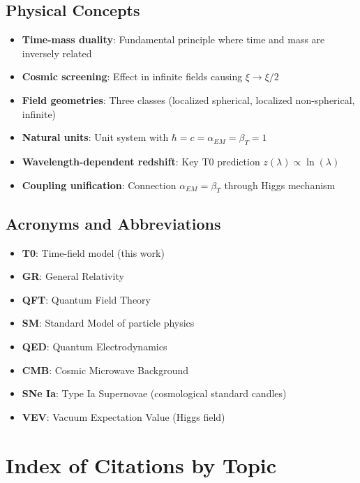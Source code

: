 \documentclass[12pt,a4paper]{article}
\begin{document}
	\subsection{Physical Concepts}
	\label{app:physics_concepts}
	
	\begin{itemize}
		\item \textbf{Time-mass duality}: Fundamental principle where time and mass are inversely related
		\item \textbf{Cosmic screening}: Effect in infinite fields causing $\xi \to \xi/2$
		\item \textbf{Field geometries}: Three classes (localized spherical, localized non-spherical, infinite)
		\item \textbf{Natural units}: Unit system with $\hbar = c = \alpha_{EM} = \beta_T = 1$
		\item \textbf{Wavelength-dependent redshift}: Key T0 prediction $z(\lambda) \propto \ln(\lambda)$
		\item \textbf{Coupling unification}: Connection $\alpha_{EM} = \beta_T$ through Higgs mechanism
	\end{itemize}
	
	\subsection{Acronyms and Abbreviations}
	\label{app:abbreviations}
	
	\begin{itemize}
		\item \textbf{T0}: Time-field model (this work)
		\item \textbf{GR}: General Relativity \citep{einstein1915,misner1973}
		\item \textbf{QFT}: Quantum Field Theory \citep{weinberg1995,peskin1995}
		\item \textbf{SM}: Standard Model of particle physics \citep{weinberg2003}
		\item \textbf{QED}: Quantum Electrodynamics \citep{feynman1985,peskin1995}
		\item \textbf{CMB}: Cosmic Microwave Background \citep{planck2020}
		\item \textbf{SNe Ia}: Type Ia Supernovae (cosmological standard candles)
		\item \textbf{VEV}: Vacuum Expectation Value (Higgs field)
	\end{itemize}
	
	\section*{Index of Citations by Topic}
	\label{app:citation_index}
	
\end{document}
